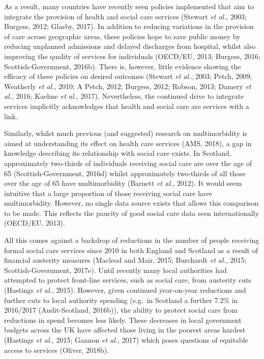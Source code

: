 \documentclass[12pt,a4paper,oneside,table]{report}
\begin{document}
As a result, many countries have recently seen policies implemented that
aim to integrate the provision of health and social care services
(Stewart \emph{et al.}, 2003; Burgess, 2012; Glasby, 2017). In addition
to reducing variations in the provision of care across geographic areas,
these policies hope to save public money by reducing unplanned
admissions and delayed discharges from hospital, whilst also improving
the quality of services for individuals (OECD/EU, 2013; Burgess, 2016;
Scottish-Government, 2016b). There is, however, little evidence showing
the efficacy of these policies on desired outcomes (Stewart \emph{et
al.}, 2003; Petch, 2009; Weatherly \emph{et al.}, 2010; A Petch, 2012;
Burgess, 2012; Robson, 2013; Damery \emph{et al.}, 2016; Kaehne \emph{et
al.}, 2017). Nevertheless, the continued drive to integrate services
implicitly acknowledges that health and social care are services with a
link.

Similarly, whilst much previous (and suggested) research on
multimorbidity is aimed at understanding its effect on health care
services (AMS, 2018), a gap in knowledge describing its relationship
with social care exists. In Scotland, approximately two-thirds of
individuals receiving social care are over the age of 65
(Scottish-Government, 2016d) whilst approximately two-thirds of all
those over the age of 65 have multimorbidity (Barnett \emph{et al.},
2012). It would seem intuitive that a large proportion of those
receiving social care have multimorbidity. However, no single data
source exists that allows this comparison to be made. This reflects the
paucity of good social care data seen internationally (OECD/EU, 2013).

All this comes against a backdrop of reductions in the number of people
receiving formal social care services since 2010 in both England and
Scotland as a result of financial austerity measures (Macleod and Mair,
2015; Burchardt \emph{et al.}, 2015; Scottish-Government, 2017e). Until
recently many local authorities had attempted to protect front-line
services, such as social care, from austerity cuts (Hastings \emph{et
al.}, 2015). However, given continued year-on-year reductions and
further cuts to local authority spending (e.g.~in Scotland a further
7.2\% in 2016/2017 (Audit-Scotland, 2016b)), the ability to protect
social care from reductions in spend becomes less likely. These
decreases in local government budgets across the UK have affected those
living in the poorest areas hardest (Hastings \emph{et al.}, 2015;
Gannon \emph{et al.}, 2017) which poses questions of equitable access to
services (Oliver, 2018b).
\end{document}
